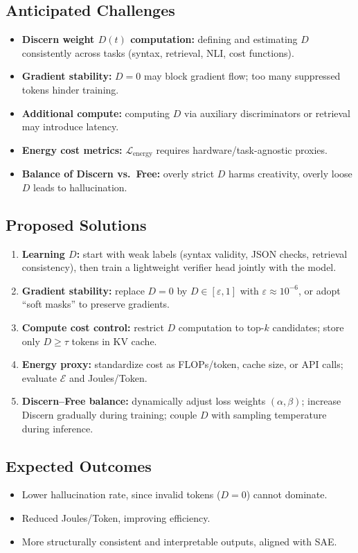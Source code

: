 \documentclass[11pt]{article}
\theoremstyle{plain}
\theoremstyle{definition}
\theoremstyle{remark}
\begin{document}
\subsection{Anticipated Challenges}
\begin{itemize}
  \item \textbf{Discern weight $D(t)$ computation:} defining and estimating $D$ consistently across tasks
        (syntax, retrieval, NLI, cost functions).
  \item \textbf{Gradient stability:} $D=0$ may block gradient flow; too many suppressed tokens hinder training.
  \item \textbf{Additional compute:} computing $D$ via auxiliary discriminators or retrieval may introduce latency.
  \item \textbf{Energy cost metrics:} $\mathcal{L}_{\text{energy}}$ requires hardware/task-agnostic proxies.
  \item \textbf{Balance of Discern vs.\ Free:} overly strict $D$ harms creativity, overly loose $D$ leads to hallucination.
\end{itemize}

\subsection{Proposed Solutions}
\begin{enumerate}
  \item \textbf{Learning $D$:} start with weak labels (syntax validity, JSON checks, retrieval consistency),
        then train a lightweight verifier head jointly with the model.
  \item \textbf{Gradient stability:} replace $D=0$ by $D \in [\varepsilon,1]$ with $\varepsilon \approx 10^{-6}$,
        or adopt ``soft masks'' to preserve gradients.
  \item \textbf{Compute cost control:} restrict $D$ computation to top-$k$ candidates; store only $D \geq \tau$ tokens in KV cache.
  \item \textbf{Energy proxy:} standardize cost as FLOPs/token, cache size, or API calls; evaluate $\mathcal{E}$ and Joules/Token.
  \item \textbf{Discern--Free balance:} dynamically adjust loss weights $(\alpha,\beta)$;
        increase Discern gradually during training; couple $D$ with sampling temperature during inference.
\end{enumerate}

\subsection{Expected Outcomes}
\begin{itemize}
  \item Lower hallucination rate, since invalid tokens ($D=0$) cannot dominate.
  \item Reduced Joules/Token, improving efficiency.
  \item More structurally consistent and interpretable outputs, aligned with SAE.
\end{itemize}
\end{document}
